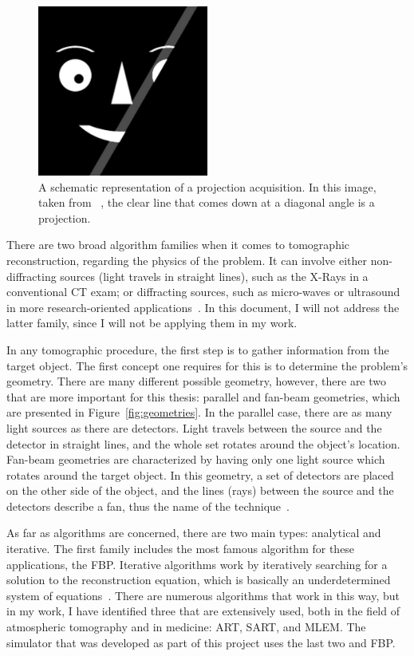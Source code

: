 \begin{figure}[htpb]
    \centering
    \includegraphics[width=0.5\textwidth]{img/png/projections.png}
    \caption{A schematic representation of a projection acquisition. In
    this image, taken from ~\cite{Herman2009}, the clear line that comes
    down at a diagonal angle is a projection.}
    \label{fig:projection}
\end{figure}

There are two broad algorithm families when it comes to tomographic
reconstruction, regarding the physics of the problem. It can involve
either non-diffracting sources (light travels in straight lines), such
as the X-Rays in a conventional \gls{CT} exam; or diffracting sources,
such as micro-waves or ultrasound in more research-oriented
applications~\cite{Kak2001}. In this document, I will not address the
latter family, since I will not be applying them in my work.

In any tomographic procedure, the first step is to gather information
from the target object. The first concept one requires for this is to
determine the problem's geometry. There are many different possible
geometry, however, there are two that are more important for this
thesis: parallel and fan-beam geometries, which are presented in
Figure~\ref{fig:geometries}. In the parallel case, there are as many
light sources as there are detectors. Light travels between the source
and the detector in straight lines, and the whole set rotates around the
object's location. Fan-beam geometries are characterized by having only
one light source which rotates around the target object. In this
geometry, a set of detectors are placed on the other side of the object,
and the lines (rays) between the source and the detectors describe a
fan, thus the name of the technique~\cite{Herman2009, Kak2001}.

As far as algorithms are concerned, there are two main types: analytical
and iterative. The first family includes the most famous algorithm for
these applications, the \gls{FBP}. Iterative algorithms work by iteratively
searching for a solution to the reconstruction equation, which is
basically an underdetermined system of equations~.
There are numerous algorithms that work in this way, but in my work, I
have identified three that are extensively used, both in the field of
atmospheric tomography and in medicine: \gls{ART}, \gls{SART}, and
\gls{MLEM}. The simulator that was developed as part of this project
uses the last two and \gls{FBP}.

